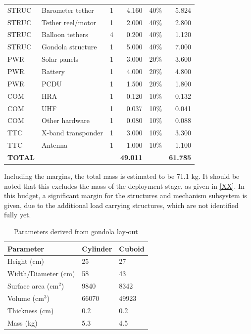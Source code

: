 \begin{longtable}{llrrrr}
STRUC & Barometer tether & 1 & 4.160 & 40\% & 5.824 \\
STRUC & Tether reel/motor & 1 & 2.000 & 40\% & 2.800 \\
STRUC & Balloon tethers & 4 & 0.200 & 40\% & 1.120 \\
STRUC & Gondola structure & 1 & 5.000 & 40\% & 7.000 \\
\hline

PWR & Solar panels & 1 & 3.000 & 20\% & 3.600 \\
PWR & Battery & 1 & 4.000 & 20\% & 4.800 \\
PWR & PCDU & 1 & 1.500 & 20\% & 1.800 \\
\hline

COM & HRA & 1 & 0.120 & 10\% & 0.132 \\
COM & UHF & 1 & 0.037 & 10\% & 0.041 \\
COM & Other hardware & 1 & 0.080 & 10\% & 0.088 \\
\hline

TTC & X-band transponder & 1 & 3.000 & 10\% & 3.300 \\
TTC & Antenna & 1 & 1.000 & 10\% & 1.100 \\
\hline

\textbf{TOTAL} &  &  & \textbf{49.011} &  & \textbf{61.785} \\
\hline
\end{longtable}

Including the margins, the total mass is estimated to be 71.1 kg. It should be noted that this excludes the mass of the deployment stage, as given in \autoref{XX}. In this budget, a significant margin for the structures and mechanism subsystem is given, due to the additional load carrying structures, which are not identified fully yet. 

\begin{table}[H]
\centering
\caption{Parameters derived from gondola lay-out}
\label{tab:struc_est}
\begin{tabular}{lll}
\hline
\textbf{Parameter} & \textbf{Cylinder} & \textbf{Cuboid} \\
\hline
Height (cm) & 25 & 27 \\
Width/Diameter (cm) & 58 & 43 \\
Surface area (cm$^2$) & 9840 & 8342 \\
Volume (cm$^3$) & 66070 & 49923 \\
Thickness (cm) & 0.2 & 0.2 \\
Mass (kg) & 5.3 & 4.5 \\
\end{tabular}
\end{table}

